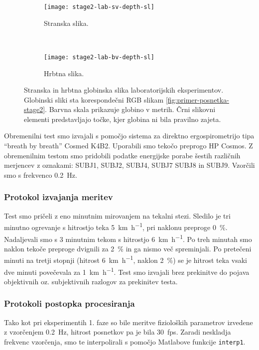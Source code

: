 \begin{figure}[!htb]
	\centering
	\begin{subfigure}[t]{0.45\columnwidth}
		\centering
		\texttt{[image: stage2-lab-sv-depth-sl]}
		\caption{Stranska slika.}
	\end{subfigure}
	~
	\begin{subfigure}[t]{0.45\columnwidth}
		\centering
		\texttt{[image: stage2-lab-bv-depth-sl]}
		\caption{Hrbtna slika.}
	\end{subfigure}
	\caption[Stranska in hrbtna globinska slika laboratorijskih eksperimentov]{Stranska in hrbtna globinska slika laboratorijskih eksperimentov. Globinski sliki sta korespondečni RGB slikam \ref{fig:primer-posnetka-stage2}. Barvna skala prikazuje globino v metrih. Črni slikovni elementi predstavljajo točke, kjer globina ni bila pravilno zajeta.}
	\label{fig:stage2-lab-of-depth}
\end{figure}

Obremenilni test smo izvajali s pomočjo sistema za direktno ergospirometrijo tipa ``breath  by breath'' Cosmed K4B2. Uporabili smo  tekočo  preprogo HP Cosmos. Z obremenilnim testom smo pridobili podatke energijske porabe šestih različnih merjencev z oznakami: SUBJ1, SUBJ2, SUBJ4, SUBJ7 SUBJ8 in SUBJ9. Vzorčili smo s frekvenco \SI{0.2}{\hertz}.

\subsubsection{Protokol izvajanja meritev}
Test smo pričeli z eno minutnim mirovanjem na tekalni stezi. Sledilo je tri minutno ogrevanje s hitrostjo teka \SI{5}{\km\per\hour}, pri naklonu preproge \SI{0}{\%}. Nadaljevali smo s 3 minutnim tekom s hitrostjo \SI{6}{\km\per\hour}. Po treh minutah smo naklon tekoče preproge  dvignili za \SI{2}{\%} in ga nismo več spreminjali. Po pretečeni minuti na  tretji stopnji (hitrost \SI{6}{\km\per\hour}, naklon \SI{2}{\%}) se je hitrost teka vsaki dve  minuti  povečevala za \SI{1}{\km\per\hour}. Test smo izvajali brez prekinitve do pojava objektivnih oz. subjektivnih razlogov za prekinitev testa. 
 

\subsubsection{Protokoli postopka procesiranja}
Tako kot pri eksperimentih 1. faze so bile  meritve fizioloških parametrov izvedene z vzorčenjem \SI{0.2}{\hertz}, hitrost posnetkov pa je bila \SI{30}{fps}. Zaradi neskladja frekvenc vzorčenja, smo te interpolirali s pomočjo Matlabove funkcije \texttt{interp1}.


